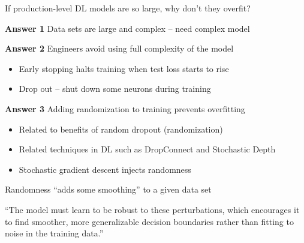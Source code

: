 \begin{frame}
    
    If production-level DL models are so large, why don't they overfit?

        \vspace{0.5em}
        \vspace{0.5em}
        \vspace{0.5em}

    \textbf{Answer 1} Data sets are large and complex -- need complex model

        \vspace{0.5em}
        \vspace{0.5em}
    \textbf{Answer 2} Engineers avoid using full complexity of the model

    \begin{itemize}
        \item Early stopping halts training when test loss starts to rise
        \vspace{0.5em}
        \item Drop out -- shut down some neurons during training
    \end{itemize}


\end{frame}

\begin{frame}
    
    \textbf{Answer 3} Adding randomization to training prevents overfitting

    \begin{itemize}
        \item Related to benefits of random dropout (randomization)
        \vspace{0.5em}
        \item Related techniques in DL such as DropConnect and Stochastic Depth
        \vspace{0.5em}
        \item Stochastic gradient descent injects randomness
    \end{itemize}

        \vspace{0.5em}
        \vspace{0.5em}

    Randomness ``adds some smoothing'' to a given data set

    ``The model must learn to be robust to these perturbations, which encourages
    it to find smoother, more generalizable decision boundaries rather than
    fitting to noise in the training data.'' 



\end{frame}


